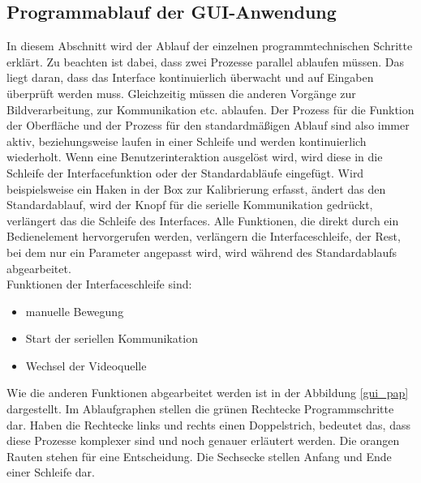 \subsection{Programmablauf der GUI-Anwendung}
\label{subsect:pap}

In diesem Abschnitt wird der Ablauf der einzelnen programmtechnischen Schritte erklärt. Zu beachten ist dabei, dass zwei Prozesse parallel ablaufen müssen. Das liegt daran, dass das Interface kontinuierlich überwacht und auf Eingaben überprüft werden muss. Gleichzeitig müssen die anderen Vorgänge zur Bildverarbeitung, zur Kommunikation etc. ablaufen. 
Der Prozess für die Funktion der Oberfläche und der Prozess für den standardmäßigen Ablauf sind also immer aktiv, beziehungsweise laufen in einer Schleife und werden kontinuierlich wiederholt. Wenn eine Benutzerinteraktion ausgelöst wird, wird diese in die Schleife der  Interfacefunktion oder der Standardabläufe eingefügt. Wird beispielsweise ein Haken in der Box zur Kalibrierung erfasst, ändert das den Standardablauf, wird der Knopf für die serielle Kommunikation gedrückt, verlängert das die Schleife des Interfaces. Alle Funktionen, die direkt durch ein Bedienelement hervorgerufen werden, verlängern die Interfaceschleife, der Rest, bei dem nur ein Parameter angepasst wird, wird während des Standardablaufs abgearbeitet.\\
 Funktionen der Interfaceschleife sind:\\
\begin{itemize}
\item manuelle Bewegung
\item Start der seriellen Kommunikation
\item Wechsel der Videoquelle
\end{itemize}

Wie die anderen Funktionen abgearbeitet werden ist in der Abbildung \ref{gui_pap} dargestellt. Im Ablaufgraphen stellen die grünen Rechtecke Programmschritte dar. Haben die Rechtecke links und rechts einen Doppelstrich, bedeutet das, dass diese Prozesse komplexer sind und noch genauer erläutert werden. Die orangen Rauten stehen für eine Entscheidung. Die Sechsecke stellen Anfang und Ende einer Schleife dar.\\\\

